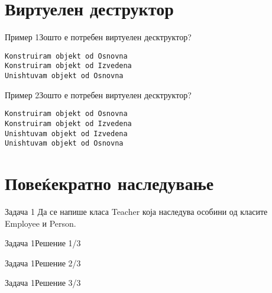 
\section{Виртуелен деструктор}

\begin{frame}[fragile]{Пример 1}{Зошто е потребен виртуелен десктруктор?}

\begin{tiny}
\begin{verbatim}
Konstruiram objekt od Osnovna
Konstruiram objekt od Izvedena
Unishtuvam objekt od Osnovna
\end{verbatim}
\end{tiny}
\end{frame}

\begin{frame}[fragile]{Пример 2}{Зошто е потребен виртуелен десктруктор?}

\begin{tiny}
\begin{verbatim}
Konstruiram objekt od Osnovna
Konstruiram objekt od Izvedena
Unishtuvam objekt od Izvedena
Unishtuvam objekt od Osnovna
\end{verbatim}
\end{tiny}
\end{frame}

\section{Повеќекратно наследување}

\begin{frame}{Задача 1}
Да се напише класа Teacher која наследува особини од класите Employee и Person.
\end{frame}

\begin{frame}[fragile]{Задача 1}{Решение 1/3}

\end{frame}

\begin{frame}[fragile]{Задача 1}{Решение 2/3}

\end{frame}

\begin{frame}[fragile]{Задача 1}{Решение 3/3}

\end{frame}

